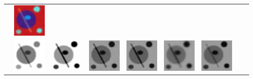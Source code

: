 \begin{tabular}{M{0.02cm}*{8}{M{2.5cm}}}
        &\includegraphics[width=\figurelength]{img/chapitre3/figure7/img2_8.png}\\
        &\includegraphics[width=\figurelength]{img/chapitre3/figure7/maps/img_1_1.png}
        &\includegraphics[width=\figurelength]{img/chapitre3/figure7/maps/img_2_1.png}
        &\includegraphics[width=\figurelength]{img/chapitre3/figure7/maps/img_3_1.png}
        &\includegraphics[width=\figurelength]{img/chapitre3/figure7/maps/img_4_1.png}
        &\includegraphics[width=\figurelength]{img/chapitre3/figure7/maps/img_6_1.png}
        &\includegraphics[width=\figurelength]{img/chapitre3/figure7/maps/img_7_1.png}

\end{tabular}
